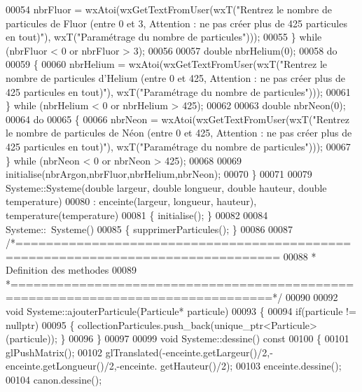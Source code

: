 \begin{DoxyCode}
00054         nbrFluor = wxAtoi(wxGetTextFromUser(wxT(\textcolor{stringliteral}{"Rentrez le nombre de particules de Fluor (entre 0 et 3,
       Attention : ne pas créer plus de 425 particules en tout)"}), wxT(\textcolor{stringliteral}{"Paramétrage du nombre de particules"})));
00055     \} \textcolor{keywordflow}{while} (nbrFluor < 0 or nbrFluor > 3);
00056     
00057     \textcolor{keywordtype}{double} nbrHelium(0);
00058     \textcolor{keywordflow}{do}
00059     \{
00060         nbrHelium = wxAtoi(wxGetTextFromUser(wxT(\textcolor{stringliteral}{"Rentrez le nombre de particules d'Helium (entre 0 et 425,
       Attention : ne pas créer plus de 425 particules en tout)"}), wxT(\textcolor{stringliteral}{"Paramétrage du nombre de particules"})));
00061     \} \textcolor{keywordflow}{while} (nbrHelium < 0 or nbrHelium > 425);
00062     
00063     \textcolor{keywordtype}{double} nbrNeon(0);
00064     \textcolor{keywordflow}{do}
00065     \{
00066         nbrNeon = wxAtoi(wxGetTextFromUser(wxT(\textcolor{stringliteral}{"Rentrez le nombre de particules de Néon (entre 0 et 425,
       Attention : ne pas créer plus de 425 particules en tout)"}), wxT(\textcolor{stringliteral}{"Paramétrage du nombre de particules"})));
00067     \} \textcolor{keywordflow}{while} (nbrNeon < 0 or nbrNeon > 425);
00068     
00069     initialise(nbrArgon,nbrFluor,nbrHelium,nbrNeon);
00070 \}
00071 
00079 Systeme::Systeme(\textcolor{keywordtype}{double} largeur, \textcolor{keywordtype}{double} longueur, \textcolor{keywordtype}{double} hauteur, \textcolor{keywordtype}{double} temperature)
00080  : enceinte(largeur, longueur, hauteur), temperature(temperature)
00081 \{ initialise(); \}
00082 
00084 Systeme::~Systeme()
00085 \{ supprimerParticules(); \}
00086 
00087 \textcolor{comment}{/*================================================================================}
00088 \textcolor{comment}{ * Definition des methodes}
00089 \textcolor{comment}{ *================================================================================*/}
00090 
00092 \textcolor{keywordtype}{void} Systeme::ajouterParticule(Particule* particule)
00093 \{ 
00094     \textcolor{keywordflow}{if}(particule != \textcolor{keyword}{nullptr})
00095     \{ collectionParticules.push\_back(unique\_ptr<Particule>(particule)); \}
00096 \}
00097 
00099 \textcolor{keywordtype}{void} Systeme::dessine()\textcolor{keyword}{ const}
00100 \textcolor{keyword}{}\{   
00101     glPushMatrix();
00102     glTranslated(-enceinte.getLargeur()/2,-enceinte.getLongueur()/2,-enceinte.
      getHauteur()/2);
00103     enceinte.dessine();
00104     canon.dessine();

\end{DoxyCode}
